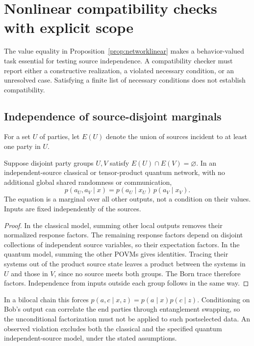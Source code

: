 \section{Nonlinear compatibility checks with explicit scope}
\label{sec:networkcompatibility}

The value equality in Proposition~\ref{prop:networklinear} makes a
behavior-valued task essential for testing source independence. A
compatibility checker must report either a constructive realization, a
violated necessary condition, or an unresolved case. Satisfying a finite
list of necessary conditions does not establish compatibility.

\subsection{Independence of source-disjoint marginals}
For a set $U$ of parties, let $E(U)$ denote the union of sources incident to
at least one party in $U$.
\begin{proposition}
\label{prop:sourcedisjoint}
Suppose disjoint party groups $U,V$ satisfy $E(U)\cap E(V)=\varnothing$.
In an independent-source classical or tensor-product quantum network,
with no additional global shared randomness or communication,
\[
 p(a_U,a_V\mid x)=p(a_U\mid x_U)\,p(a_V\mid x_V).
\]
The equation is a marginal over all other outputs, not a condition on their
values. Inputs are fixed independently of the sources.
\end{proposition}
\begin{proof}
In the classical model, summing other local outputs removes their normalized
response factors. The remaining response factors depend on disjoint
collections of independent source variables, so their expectation factors.
In the quantum model, summing the other POVMs gives identities. Tracing their
systems out of the product source state leaves a product between the systems
in $U$ and those in $V$, since no source meets both groups. The Born trace
therefore factors. Independence from inputs outside each group follows in
the same way.
\end{proof}
In a bilocal chain this forces $p(a,c\mid x,z)=p(a\mid x)p(c\mid z)$.
Conditioning on Bob's output can correlate the end parties through
entanglement swapping, so the unconditional factorization must not be
applied to such postselected data. An observed violation excludes both the
classical and the specified quantum independent-source model, under the
stated assumptions.

